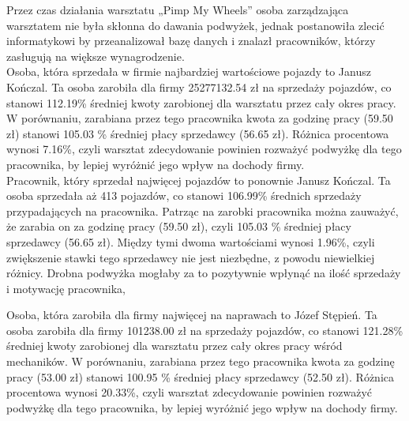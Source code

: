 \documentclass{article}\usepackage[]{graphicx}\usepackage[]{xcolor}
\makeatletter
\newenvironment{kframe}{%
 \def\at@end@of@kframe{}%
 \ifinner\ifhmode%
  \def\at@end@of@kframe{\end{minipage}}%
  \begin{minipage}{\columnwidth}%
 \fi\fi%
 \def\FrameCommand##1{\hskip\@totalleftmargin \hskip-\fboxsep
 \colorbox{shadecolor}{##1}\hskip-\fboxsep
     \hskip-\linewidth \hskip-\@totalleftmargin \hskip\columnwidth}%
 \MakeFramed {\advance\hsize-\width
   \@totalleftmargin\z@ \linewidth\hsize
   \@setminipage}}%
 {\par\unskip\endMakeFramed%
 \at@end@of@kframe}
\newenvironment{knitrout}{}{} %
\makeatother
\begin{document}
Przez czas działania warsztatu „Pimp My Wheels” osoba zarządzająca warsztatem nie była skłonna do dawania podwyżek, jednak postanowiła zlecić informatykowi by przeanalizował bazę danych i znalazł pracowników, którzy zasługują na większe wynagrodzenie. \\




Osoba, która sprzedała w firmie najbardziej wartościowe pojazdy to Janusz Kończal. Ta osoba zarobiła dla firmy 25277132.54 zł na sprzedaży pojazdów, co stanowi 112.19\% średniej kwoty zarobionej dla warsztatu przez cały okres pracy. W porównaniu, zarabiana przez tego pracownika kwota za godzinę pracy (59.50 zł) stanowi 105.03 \% średniej płacy sprzedawcy (56.65 zł). Różnica procentowa wynosi 7.16\%, czyli warsztat zdecydowanie powinien rozważyć podwyżkę dla tego pracownika, by lepiej wyróżnić jego wpływ na dochody firmy. \\

Pracownik, który sprzedał najwięcej pojazdów to ponownie Janusz Kończal. Ta osoba sprzedała aż 413 pojazdów, co stanowi 106.99\% średnich sprzedaży przypadających na pracownika. Patrząc na zarobki pracownika można zauważyć, że zarabia on za godzinę pracy (59.50 zł), czyli 105.03 \% średniej płacy sprzedawcy (56.65 zł). Między tymi dwoma wartościami wynosi 1.96\%, czyli zwiększenie stawki tego sprzedawcy nie jest niezbędne, z powodu niewielkiej różnicy. Drobna podwyżka mogłaby za to pozytywnie wpłynąć na ilość sprzedaży i motywację pracownika, 

\begin{knitrout}
\color{fgcolor}\begin{kframe}


{\ttfamily\noindent\bfseries\color{errorcolor}{\#\# Error in `[.data.frame`(najwiecej\_sprzedaży, , 5): nie wybrano kolumn}}

{\ttfamily\noindent\bfseries\color{errorcolor}{\#\# Error in round(najwiecej\_sprzedaży\$ile\_sprzedanych, 2): argument nieliczbowy przekazany do funkcji matematycznej}}

{\ttfamily\noindent\bfseries\color{errorcolor}{\#\# Error in `[.data.frame`(najwiecej\_sprzedaży, , 5): nie wybrano kolumn}}\end{kframe}
\end{knitrout}


Osoba, która zarobiła dla firmy najwięcej na naprawach to Józef Stępień. Ta osoba zarobiła dla firmy 101238.00 zł na sprzedaży pojazdów, co stanowi 121.28\% średniej kwoty zarobionej dla warsztatu przez cały okres pracy wśród mechaników. W porównaniu, zarabiana przez tego pracownika kwota za godzinę pracy (53.00 zł) stanowi 100.95 \% średniej płacy sprzedawcy (52.50 zł). Różnica procentowa wynosi 20.33\%, czyli warsztat zdecydowanie powinien rozważyć podwyżkę dla tego pracownika, by lepiej wyróżnić jego wpływ na dochody firmy. \\
\end{document}
